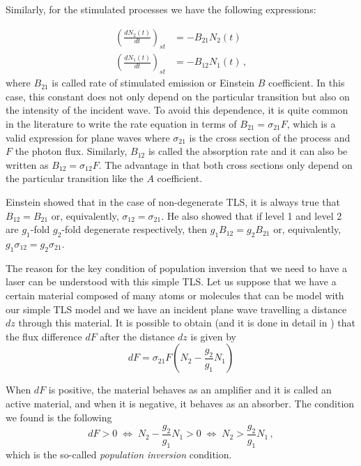 \documentclass[11pt,a4paper]{article}
\begin{document}
Similarly, for the stimulated processes we have the following expressions:

\begin{align}\label{eq:stimulated_emission}
\left(\frac{dN_2(t)}{dt}\right)_{st}&=-B_{21}N_2(t)\\ \label{eq:absorption}
\left(\frac{dN_1(t)}{dt}\right)_{st}&=-B_{12}N_1(t)\,,
\end{align}
where $B_{21}$ is called rate of stimulated emission or Einstein $B$ coefficient. In this case, this constant does not only depend on the particular transition but also on the intensity of the incident wave. To avoid this dependence, it is quite common in the literature to write the rate equation in terms of $B_{21}=\sigma_{21}F$, which is a valid expression for plane waves where $\sigma_{21}$ is the cross section of the process and $F$ the photon flux. Similarly, $B_{12}$ is called the absorption rate and it can also be written as $B_{12}=\sigma_{12}F$. The advantage in that both cross sections only depend on the particular transition like the $A$ coefficient.

Einstein showed that in the case of non-degenerate TLS, it is always true that $B_{12}=B_{21}$ or, equivalently,  $\sigma_{12}=\sigma_{21}$. He also showed that if level 1 and level 2 are $g_1$-fold $g_2$-fold degenerate respectively, then $g_1B_{12}=g_2B_{21}$ or, equivalently, $g_1\sigma_{12}=g_2\sigma_{21}$.

The reason for the key condition of population inversion that we need to have a laser can be understood with this simple TLS. Let us suppose that we have a certain material composed of many atoms or molecules that can be model with our simple TLS model and we have an incident plane wave travelling a distance $dz$ through this material. It is possible to obtain (and it is done in detail in \cite{svelto2010principles}) that the flux difference $dF$ after the distance $dz$ is given by
\begin{equation}\label{eq:dF}
dF=\sigma_{21}F\left(N_2-\frac{g_2}{g_1}N_1\right)
\end{equation}

When $dF$ is positive, the material behaves as an amplifier and it is called an active material, and when it is negative, it behaves as an absorber. The condition we found is the following
\begin{equation}
dF>0\;\Leftrightarrow\;N_2-\frac{g_2}{g_1}N_1>0\;\Leftrightarrow\;N_2>\frac{g_2}{g_1}N_1\,,
\end{equation}
which is the so-called \emph{population inversion} condition.
\end{document}
